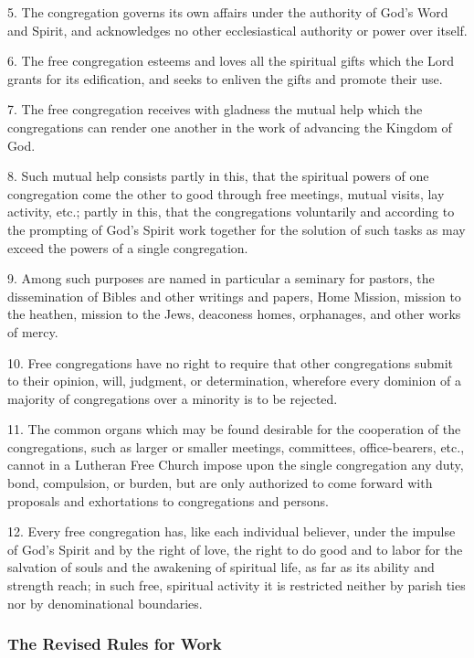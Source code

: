 5. The congregation governs its own affairs under the authority of God’s Word and Spirit, and acknowledges no other ecclesiastical authority or power over itself.

6. The free congregation esteems and loves all the spiritual gifts which the Lord grants for its edification, and seeks to enliven the gifts and promote their use.

7. The free congregation receives with gladness the mutual help which the congregations can render one another in the work of advancing the Kingdom of God.

8. Such mutual help consists partly in this, that the spiritual powers of one congregation come the other to good through free meetings, mutual visits, lay activity, etc.; partly in this, that the congregations voluntarily and according to the prompting of God’s Spirit work together for the solution of such tasks as may exceed the powers of a single congregation.

9. Among such purposes are named in particular a seminary for pastors, the dissemination of Bibles and other writings and papers, Home Mission, mission to the heathen, mission to the Jews, deaconess homes, orphanages, and other works of mercy.

10. Free congregations have no right to require that other congregations submit to their opinion, will, judgment, or determination, wherefore every dominion of a majority of congregations over a minority is to be rejected.

11. The common organs which may be found desirable for the cooperation of the congregations, such as larger or smaller meetings, committees, office-bearers, etc., cannot in a Lutheran Free Church impose upon the single congregation any duty, bond, compulsion, or burden, but are only authorized to come forward with proposals and exhortations to congregations and persons.

12. Every free congregation has, like each individual believer, under the impulse of God’s Spirit and by the right of love, the right to do good and to labor for the salvation of souls and the awakening of spiritual life, as far as its ability and strength reach; in such free, spiritual activity it is restricted neither by parish ties nor by denominational boundaries.


\pagebreak
\subsubsection{The Revised Rules for Work}

